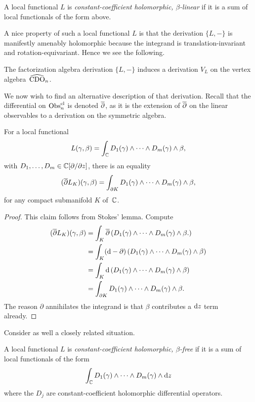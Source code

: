 \begin{dfn}
A local functional $L$ is {\em constant-coefficient holomorphic, $\beta$-linear} if it is a sum of local functionals of the form above.
\end{dfn}

A nice property of such a local functional $L$ is that the derivation $\{L,-\}$ is manifestly amenably holomorphic 
because the integrand is translation-invariant and rotation-equivariant. Hence we see the following.

\begin{lemma}
The factorization algebra derivation $\{L,-\}$ induces a derivation $V_L$ on the vertex algebra~$\widehat{\rm CDO}_n$.
\end{lemma}

We now wish to find an alternative description of that derivation.
Recall that the differential on ${\rm Obs}^{\rm cl}_n$ is denoted $\overline{\partial}$, 
as it is the extension of $\overline{\partial}$ on the linear observables to a derivation on the symmetric algebra.

\begin{lemma}
For a local functional
\[
L(\gamma,\beta) = \int_\mathbb C D_1(\gamma) \wedge \cdots \wedge D_m(\gamma) \wedge \beta,
\]
with $D_1,\ldots,D_m \in \mathbb C[\partial/\partial z]$, there is an equality
\[
(\overline{\partial} L_K)(\gamma,\beta) = \int_{\partial K} D_1(\gamma) \wedge \cdots \wedge D_m(\gamma) \wedge \beta,
\]
for any compact submanifold $K$ of~$\mathbb C$.
\end{lemma}

\begin{proof}
This claim follows from Stokes' lemma.
Compute
\begin{align*}
(\overline{\partial} L_K)(\gamma,\beta) 
&= \int_K \overline{\partial} \left( D_1(\gamma) \wedge \cdots \wedge D_m(\gamma) \wedge \beta. \right)\\
&= \int_K ({\rm d} - \partial) \left( D_1(\gamma) \wedge \cdots \wedge D_m(\gamma) \wedge \beta \right)\\
&= \int_K {\rm d} \left( D_1(\gamma) \wedge \cdots \wedge D_m(\gamma) \wedge \beta \right)\\
&= \int_{\partial K} D_1(\gamma) \wedge \cdots \wedge D_m(\gamma) \wedge \beta.
\end{align*}
The reason $\partial$ annihilates the integrand is that $\beta$ contributes a ${\rm d} z$ term already.
\end{proof}

Consider as well a closely related situation.

\begin{dfn}
A local functional $L$ is {\em constant-coefficient holomorphic, $\beta$-free} if it is a sum of local functionals of the form
\[
\int_\mathbb C D_1(\gamma) \wedge \cdots \wedge D_m(\gamma) \wedge {\rm d} z
\]
where the $D_j$ are constant-coefficient holomorphic differential operators.
\end{dfn}

